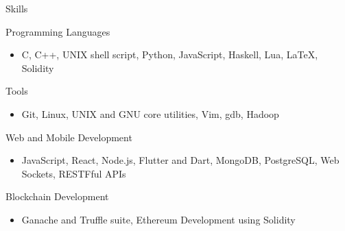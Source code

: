 \documentclass{article}
\newlength{\tabin}
\newlength{\secsep}
\newcommand{\lineunder}{\vspace*{-8pt} \\ \hspace*{-6pt} \hrulefill \\ \vspace*{-15pt}}
\newenvironment{tabbedsection}[1]{
	\begin{list}{}{
		\setlength{\itemsep}{0pt}
		\setlength{\labelsep}{0pt}
		\setlength{\labelwidth}{0pt}
		\setlength{\leftmargin}{\tabin}
		\setlength{\rightmargin}{\tabin}
		\setlength{\listparindent}{0pt}
		\setlength{\parsep}{0pt}
		\setlength{\parskip}{0pt}
		\setlength{\partopsep}{0pt}
		\setlength{\topsep}{#1}
	}
	\item[]
}{\end{list}}
\newenvironment{resume_section}[1]{
	\filbreak
	\vspace{2\secsep}
	\textsc{\large#1}
	\lineunder
	\begin{tabbedsection}{\secsep}
}{\end{tabbedsection}}
\newenvironment{resume_subsection}[2][]{
	\textbf{#2} \hfill {\footnotesize #1} \hspace{2em}
	\begin{tabbedsection}{0.5\secsep}
}{\end{tabbedsection}}
\newenvironment{subitems}{
	\renewcommand{\labelitemi}{-}
	\begin{itemize}
		\setlength{\labelsep}{1em}
}{\end{itemize}}
\begin{document}
\begin{resume_section}{Skills}

	\begin{resume_subsection}{Programming Languages}
		\begin{subitems}
		\item C, C++, UNIX shell script, Python, JavaScript, Haskell, Lua, {\LaTeX}, Solidity
		\end{subitems}
	\end{resume_subsection}

	\begin{resume_subsection}{Tools}
		\begin{subitems}
		\item Git, Linux, UNIX and GNU core utilities, Vim, gdb, Hadoop
		\end{subitems}
	\end{resume_subsection}

	\begin{resume_subsection}{Web and Mobile Development}
		\begin{subitems}
		\item JavaScript, React, Node.js, Flutter and Dart, MongoDB, PostgreSQL, Web Sockets, RESTFful APIs
		\end{subitems}
	\end{resume_subsection}

	\begin{resume_subsection}{Blockchain Development}
		\begin{subitems}
		\item Ganache and Truffle suite, Ethereum Development using Solidity
		\end{subitems}
	\end{resume_subsection}

\end{resume_section}
\end{document}

